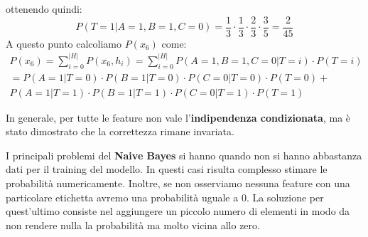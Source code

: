 \begin{esempio}
    ottenendo quindi:
    \begin{equation}
        P(T = 1 | A = 1, B = 1, C = 0) = \frac{1}{3} \cdot \frac{1}{3} \cdot
        \frac{2}{3} \cdot \frac{3}{5} = \frac{2}{45}
    \end{equation}
    A questo punto calcoliamo $P(x_6)$ come:
    \begin{equation}
        \begin{aligned}
            P(x_6) = \sum_{i = 0}^{|H|} P(x_6, h_i) = \sum_{i = 0}^{|H|}
            P(A =  1, B = 1, C = 0 | T = i) \cdot P(T = i) \\
            = P(A = 1 | T = 0) \cdot P(B = 1 | T = 0) \cdot P(C = 0 | T = 0)
            \cdot P(T = 0) +                               \\ P(A = 1 | T = 1)
            \cdot P(B = 1 | T = 1) \cdot P(C = 0 | T = 1) \cdot P(T = 1)
        \end{aligned}
    \end{equation}
\end{esempio}
In generale, per tutte le feature non vale l'\textbf{indipendenza condizionata},
ma è stato dimostrato che la correttezza rimane invariata.

I principali problemi del \textbf{Naive Bayes} si hanno quando non si hanno
abbastanza dati per il training del modello. In questi casi risulta complesso
stimare le probabilità numericamente. Inoltre, se non osserviamo nessuna feature
con una particolare etichetta avremo una probabilità uguale a $0$. La soluzione
per quest'ultimo consiste nel aggiungere un piccolo numero di elementi in modo
da non rendere nulla la probabilità ma molto vicina allo zero.

